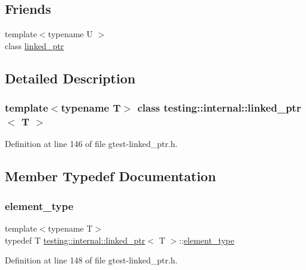 \subsection*{Friends}
\begin{DoxyCompactItemize}
\item 
{\footnotesize template$<$typename U $>$ }\\class \hyperlink{classtesting_1_1internal_1_1linked__ptr_a7763f286ca03a7f7363a033d996c8c1c}{linked\+\_\+ptr}
\end{DoxyCompactItemize}


\subsection{Detailed Description}
\subsubsection*{template$<$typename T$>$\newline
class testing\+::internal\+::linked\+\_\+ptr$<$ T $>$}



Definition at line 146 of file gtest-\/linked\+\_\+ptr.\+h.



\subsection{Member Typedef Documentation}
\mbox{\label{classtesting_1_1internal_1_1linked__ptr_a295c7d1ee4100d916514c4e4385a0063}} 
\subsubsection{\texorpdfstring{element\+\_\+type}{element\_type}}
{\footnotesize\ttfamily template$<$typename T$>$ \\
typedef T \hyperlink{classtesting_1_1internal_1_1linked__ptr}{testing\+::internal\+::linked\+\_\+ptr}$<$ T $>$\+::\hyperlink{classtesting_1_1internal_1_1linked__ptr_a295c7d1ee4100d916514c4e4385a0063}{element\+\_\+type}}



Definition at line 148 of file gtest-\/linked\+\_\+ptr.\+h.



